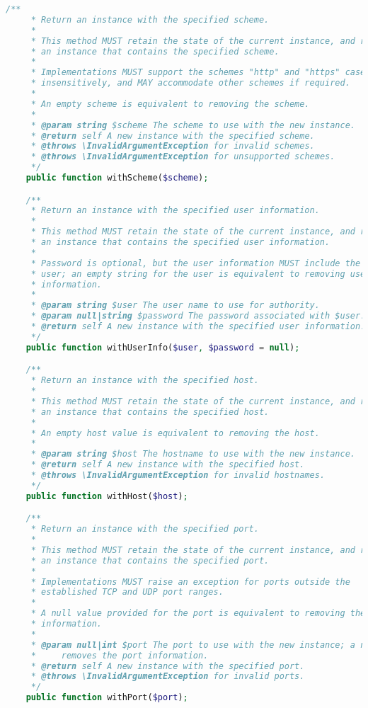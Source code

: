 \begin{lstlisting}[language=PHP]
    /**
     * Return an instance with the specified scheme.
     *
     * This method MUST retain the state of the current instance, and return
     * an instance that contains the specified scheme.
     *
     * Implementations MUST support the schemes "http" and "https" case
     * insensitively, and MAY accommodate other schemes if required.
     *
     * An empty scheme is equivalent to removing the scheme.
     *
     * @param string $scheme The scheme to use with the new instance.
     * @return self A new instance with the specified scheme.
     * @throws \InvalidArgumentException for invalid schemes.
     * @throws \InvalidArgumentException for unsupported schemes.
     */
    public function withScheme($scheme);

    /**
     * Return an instance with the specified user information.
     *
     * This method MUST retain the state of the current instance, and return
     * an instance that contains the specified user information.
     *
     * Password is optional, but the user information MUST include the
     * user; an empty string for the user is equivalent to removing user
     * information.
     *
     * @param string $user The user name to use for authority.
     * @param null|string $password The password associated with $user.
     * @return self A new instance with the specified user information.
     */
    public function withUserInfo($user, $password = null);

    /**
     * Return an instance with the specified host.
     *
     * This method MUST retain the state of the current instance, and return
     * an instance that contains the specified host.
     *
     * An empty host value is equivalent to removing the host.
     *
     * @param string $host The hostname to use with the new instance.
     * @return self A new instance with the specified host.
     * @throws \InvalidArgumentException for invalid hostnames.
     */
    public function withHost($host);

    /**
     * Return an instance with the specified port.
     *
     * This method MUST retain the state of the current instance, and return
     * an instance that contains the specified port.
     *
     * Implementations MUST raise an exception for ports outside the
     * established TCP and UDP port ranges.
     *
     * A null value provided for the port is equivalent to removing the port
     * information.
     *
     * @param null|int $port The port to use with the new instance; a null value
     *     removes the port information.
     * @return self A new instance with the specified port.
     * @throws \InvalidArgumentException for invalid ports.
     */
    public function withPort($port);


\end{lstlisting}
